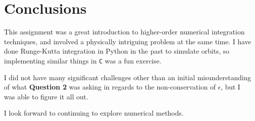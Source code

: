 \documentclass{article}
\begin{document}
\newpage
\section{Conclusions}

This assignment was a great introduction to higher-order numerical integration techniques, and involved a physically intriguing problem at the same time. I have done Runge-Kutta integration in Python in the past to simulate orbits, so implementing similar things in \texttt{C} was a fun exercise.

I did not have many significant challenges other than an initial misunderstanding of what \textbf{Question 2} was asking in regards to the non-conservation of $\epsilon$, but I was able to figure it all out.

I look forward to continuing to explore numerical methods.
\end{document}
